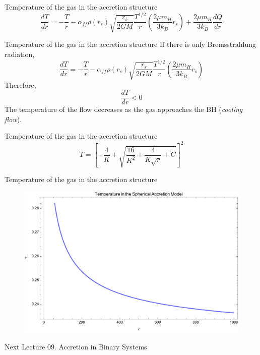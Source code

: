 \documentclass{beamer}
\begin{document}
\begin{darkframes}
\begin{frame}{Temperature of the gas in the accretion structure}
	\[ \frac{dT}{dr} = - \frac{T}{r} - \alpha_{ff} \rho(r_s) \sqrt{\frac{r_s}{2GM}} \frac{T^{1/2}}{r} 
	\left( \frac{2\mu m_H}{3k_B} r_s\right) + \frac{2\mu m_H}{3k_B} \frac{dQ}{dr} \]
\end{frame}

\begin{frame}{Temperature of the gas in the accretion structure}
	If there is only Bremsstrahlung radiation, 	
	\[ \frac{dT}{dr} = - \frac{T}{r} - \alpha_{ff} \rho(r_s) \sqrt{\frac{r_s}{2GM}} \frac{T^{1/2}}{r} 
	\left( \frac{2\mu m_H}{3k_B} r_s\right) \]
	\pause
	Therefore,
	\[ \frac{dT}{dr}<0\]
	\pause
	The temperature of the flow decreases as the gas approaches the BH (\textit{cooling flow}).
\end{frame}

\begin{frame}{Temperature of the gas in the accretion structure}
	\[T = \left[ -\frac{4}{K} + \sqrt{\frac{16}{K^2} + \frac{4}{K\sqrt{r}} +C}\right]^2 \]
\end{frame}

\end{darkframes}
\begin{frame}{Temperature of the gas in the accretion structure}
	\begin{center}
      \begin{figure}
      	\includegraphics[scale=0.45] {figures/Temperature.pdf}
      \end{figure}
	\end{center}	
\end{frame}

\begin{darkframes}

\begin{frame}{Next Lecture}
  	\Large
	{09. Accretion in Binary Systems}
\end{frame}

  
\end{darkframes}
\end{document}
